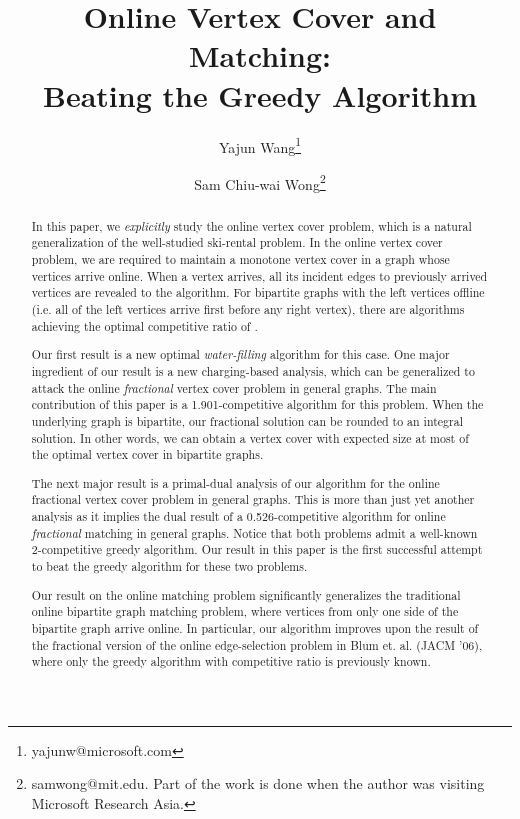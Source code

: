 \documentclass{article}
\begin{document}
\title{Online Vertex Cover and Matching:\\ Beating the Greedy Algorithm}


\author[1]{Yajun Wang\thanks{yajunw@microsoft.com}}
\author[2]{Sam Chiu-wai Wong\thanks{samwong@mit.edu. Part of the work is done when the author was visiting Microsoft Research Asia.}}


\maketitle
\begin{abstract}


In this paper, we {\em explicitly} study the online vertex cover problem, which is a natural generalization of the well-studied ski-rental problem. In the online vertex cover problem, we are required to maintain a monotone vertex cover in a graph whose vertices arrive online. When a vertex arrives, all its incident edges to previously arrived vertices are revealed to the algorithm. For bipartite graphs with the left vertices offline (i.e. all of the left vertices arrive first before any right vertex), there are algorithms achieving  the optimal competitive ratio of .

Our first result is a new optimal {\em water-filling} algorithm for this case. One major ingredient of our result is a new charging-based analysis, which can be generalized to attack the
online {\em fractional} vertex cover problem in general graphs. The main contribution of this paper is a 1.901-competitive algorithm for this problem. 
When the underlying graph is bipartite, our fractional solution can be rounded to an integral solution. In other words, we can obtain a vertex cover with expected size at most  of the optimal vertex cover in bipartite graphs.

The next major result is a primal-dual analysis of our algorithm for the online fractional vertex cover problem in general graphs.  
This is more than just yet another analysis as it implies the dual result of a 0.526-competitive algorithm for online {\em fractional} matching in general graphs. Notice that both problems admit a well-known 2-competitive greedy algorithm. Our result in this paper is the first successful attempt to beat the greedy algorithm for these two problems. 


Our result on the online matching problem significantly generalizes the traditional online bipartite graph matching problem, where vertices from only one side of the bipartite graph arrive online. In particular, our algorithm improves upon the result of the fractional version of the online edge-selection problem in Blum et. al. (JACM '06), where only the greedy algorithm with competitive ratio  is previously known. 









\end{abstract}
\end{document}
